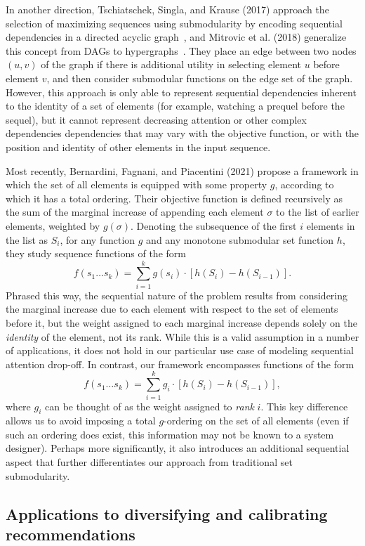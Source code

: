 In another direction, Tschiatschek, Singla, and Krause (2017) approach the selection of maximizing sequences using submodularity by encoding sequential dependencies in a directed acyclic graph~\cite{Tschiatschek2017}, and Mitrovic et al. (2018) generalize this concept from DAGs to hypergraphs~\cite{Mitrovic18}. They place an edge between two nodes $(u,v)$ of the graph if there is additional utility in selecting element $u$ before element $v$, and then consider submodular functions on the edge set of the graph. However, this approach is only able to represent sequential dependencies inherent to the identity of a set of elements (for example, watching a prequel before the sequel), but it cannot represent decreasing attention or other complex dependencies dependencies that may vary with the objective function, or with the position and identity of other elements in the input sequence. 

Most recently, Bernardini, Fagnani, and Piacentini (2021) propose a framework in which the set of all elements is equipped with some property $g$, according to which it has a total ordering. Their objective function is defined recursively as the sum of the marginal increase of appending each element $\sigma$ to the list of earlier elements, weighted by $g(\sigma)$. Denoting the subsequence of the first $i$ elements in the list as $S_i$, for any function $g$ and any monotone submodular set function $h$, they study sequence functions of the form 
$$f(s_1 \dots s_k) = \sum_{i=1}^k g(s_i) \cdot [ h(S_i) - h(S_{i-1}) ].$$
Phrased this way, the sequential nature of the problem results from considering the marginal increase due to each element with respect to the set of elements before it, but the weight assigned to each marginal increase depends solely on the \emph{identity} of the element, not its rank. While this is a valid assumption in a number of applications, it does not hold in our particular use case of modeling sequential attention drop-off. In contrast, our framework encompasses functions of the form 
$$f(s_1 \dots s_k) = \sum_{i=1}^k g_i \cdot [ h(S_i) - h(S_{i-1}) ],$$ 
where $g_i$ can be thought of as the weight assigned to \emph{rank} $i$. This key difference allows us to avoid imposing a total $g$-ordering on the set of all elements (even if such an ordering does exist, this information may not be known to a system designer). Perhaps more significantly, it also introduces an additional sequential aspect that further differentiates our approach from traditional set submodularity. 


\subsection{Applications to diversifying and calibrating recommendations} 

